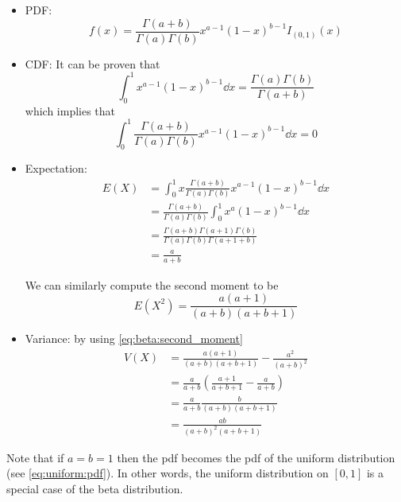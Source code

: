 \documentclass[12pt]{extarticle}
\begin{document}
\begin{itemize}
    \item PDF:
          \begin{equation}
              f(x) = \frac{\Gamma(a+b)}{\Gamma(a)\Gamma(b)}x^{a-1}(1-x)^{b-1}I_{(0,1)}(x)
          \end{equation}
    \item CDF: It can be proven that
          \begin{equation}
              \int_0^1 x^{a -1}(1-x)^{b-1} \dd{x} = \frac{\Gamma(a) \Gamma(b)}{\Gamma(a + b)}
          \end{equation}
          which implies that
          \begin{equation}
              \int_0^1 \frac{\Gamma(a+b)}{\Gamma(a)\Gamma(b)}x^{a-1}(1-x)^{b-1} \dd{x}= 0
          \end{equation}
    \item Expectation:
          \begin{align}
              E(X) & = \int_0^1 x \frac{\Gamma(a+b)}{\Gamma(a)\Gamma(b)}x^{a-1}(1-x)^{b-1} \dd{x}       \\
                   & = \frac{\Gamma(a+b)}{\Gamma(a)\Gamma(b)} \int_0^1 x^a (1-x)^{b-1} \dd{x}           \\
                   & = \frac{\Gamma(a + b) \Gamma(a+1) \Gamma(b)}{\Gamma(a) \Gamma(b) \Gamma(a + 1+ b)} \\
                   & = \frac{a}{a+b}
          \end{align}

          We can similarly compute the second moment to be
          \begin{equation}
              \label{eq:beta:second_moment}
              E(X^2) = \frac{a(a+1)}{(a+b)(a+ b+ 1)}
          \end{equation}
    \item Variance: by using \ref{eq:beta:second_moment}
          \begin{align}
              V(X) & = \frac{a(a+1)}{(a+b)(a+ b+ 1)} - \frac{a^2}{(a + b)^2}               \\
                   & = \frac{a}{a+ b} \left(\frac{a + 1}{a + b + 1} - \frac{a}{a+b}\right) \\
                   & = \frac{a}{a+b} \frac{b}{(a+b)(a + b + 1)}                            \\
                   & = \frac{ab}{(a+b)^2(a+b+1)}
          \end{align}
\end{itemize}

Note that if $a = b = 1$ then the pdf becomes the pdf of the uniform distribution (see \ref{eq:uniform:pdf}).
In other words, the uniform distribution on $[0, 1]$ is a special case of the beta distribution.
\end{document}
